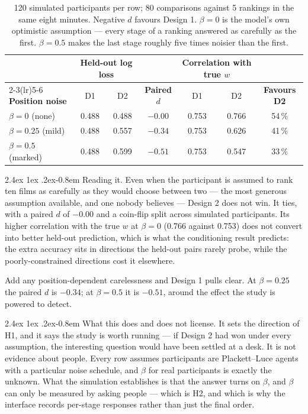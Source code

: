 \documentclass[11pt,a4paper]{article}
\makeatletter
\renewcommand\paragraph{\@startsection{paragraph}{4}{\z@}%
  {2.4ex \@plus1ex \@minus.2ex}{-0.8em}%
  {\normalfont\normalsize\sffamily\bfseries\color{black}}}
\makeatother
\begin{document}
\begin{table}[H]
\centering\small
\begin{tabular}{lcccccc}
\toprule
& \multicolumn{2}{c}{\textbf{Held-out log loss}} & &
  \multicolumn{2}{c}{\textbf{Correlation with true $w$}} & \\
\cmidrule(lr){2-3}\cmidrule(lr){5-6}
\textbf{Position noise} & D1 & D2 & \textbf{Paired $d$} & D1 & D2 &
\textbf{Favours D2} \\
\midrule
$\beta = 0$ (none)      & 0.488 & 0.488 & $-0.00$ & 0.753 & 0.766 & 54\,\% \\
$\beta = 0.25$ (mild)   & 0.488 & 0.557 & $-0.34$ & 0.753 & 0.626 & 41\,\% \\
$\beta = 0.5$ (marked)  & 0.488 & 0.599 & $-0.51$ & 0.753 & 0.547 & 33\,\% \\
\bottomrule
\end{tabular}
\caption{120 simulated participants per row; 80 comparisons against 5 rankings
in the same eight minutes. Negative $d$ favours Design 1. $\beta = 0$ is the
model's own optimistic assumption --- every stage of a ranking answered as
carefully as the first. $\beta = 0.5$ makes the last stage roughly five times
noisier than the first.}
\end{table}

\paragraph{Reading it.} Even when the participant is assumed to rank ten films as
carefully as they would choose between two --- the most generous assumption
available, and one nobody believes --- Design 2 does not win. It ties, with a
paired $d$ of $-0.00$ and a coin-flip split across simulated participants. Its
higher correlation with the true $w$ at $\beta = 0$ (0.766 against 0.753) does
not convert into better held-out prediction, which is what the conditioning
result predicts: the extra accuracy sits in directions the held-out pairs rarely
probe, while the poorly-constrained directions cost it elsewhere.

Add any position-dependent carelessness and Design 1 pulls clear. At
$\beta = 0.25$ the paired $d$ is $-0.34$; at $\beta = 0.5$ it is $-0.51$, around
the effect the study is powered to detect.

\paragraph{What this does and does not license.} It sets the direction of H1, and
it says the study is worth running --- if Design 2 had won under every assumption,
the interesting question would have been settled at a desk. It is not evidence
about people. Every row assumes participants are Plackett--Luce agents with a
particular noise schedule, and $\beta$ for real participants is exactly the
unknown. What the simulation establishes is that the answer turns on $\beta$, and
$\beta$ can only be measured by asking people --- which is H2, and which is why
the interface records per-stage responses rather than just the final order.
\end{document}
